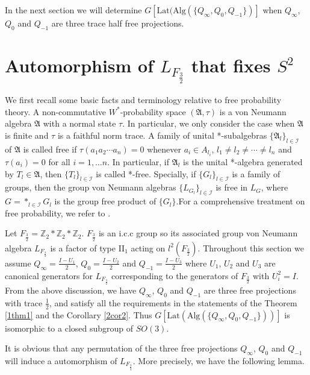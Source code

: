 \documentclass{amsart}
\newcommand{\AAA}{\mathfrak A}
\newcommand{\Lat}{\mathrm{Lat}}
\newcommand{\Alg}{\mathrm{Alg}}
\newcommand{\Z}{\mathbb Z} %
\begin{document}
In the next section we will determine $ G[\Lat(\Alg( \{ Q_{\infty},  Q_{0}, Q_{-1} \})]$ when $Q_{\infty}$, $Q_{0}$ and $Q_{-1} $ are three trace half free projections.


\section{Automorphism of $L_{F_{\frac{3}{2}}}$ that fixes $S^2$}

We first recall some basic facts and terminology relative to free probability theory.
A non-commutative $W^{*}$-probability space $(\AAA, \tau)$ is a von Neumann algebra $\AAA$ with a normal state $\tau$.
In particular, we only consider the case when $\AAA$ is finite and $\tau$ is a faithful norm trace. 
A family of unital *-subalgebras $\{\AAA_{l} \}_{l \in \mathcal{I}}$ of $\AAA$ is called free if $\tau(a_1 a_2 \cdots a_n) = 0$ 
whenever $a_i \in A_{l_{i}}$, $l_1 \neq l_2 \neq \cdots \neq l_n$ and $\tau(a_{i}) = 0$ for all $i = 1, \ldots n$.
In particular, if $\AAA_l$ is the unital *-algebra generated by $T_l \in \AAA$, then $\{T_l \}_{l \in \mathcal{I}}$ is called *-free.  
Specially, if $\{G_l\}_{l \in \mathcal{I}}$ is a family of groups, then  
the group von Neumann algebras $\{L_{G_l} \}_{l \in \mathcal{I}}$ is free in $L_{G}$, where $G = *_{l \in \mathcal{I}} G_{l}$ is the group free 
product of $\{G_l\}$.For a comprehensive treatment on free probability, we refer to \cite{VDN, NS}. 

Let $F_{\frac{3}{2}} = \Z_{2}*\Z_{2}*\Z_{2}$. $F_{\frac{3}{2}} $ is an i.c.c group so its associated group von Neumann algebra $L_{F_{\frac{3}{2}}}$ is 
a factor of type II$_1$ acting on $l^2(F_{\frac{3}{2}})$.
Throughout this section we assume $Q_{\infty} = \frac{I - U_1}{2}$, $Q_{0} = \frac{I - U_2}{2}$ and $Q_{-1} = \frac{I - U_3}{2}$
where $U_1$, $U_2$ and $U_3$ are canonical generators for $L_{F_{\frac{3}{2}}}$ corresponding to the generators of $F_{\frac{3}{2}}$ with $U_{i}^2 = I$.
From the above discussion, we have $Q_{\infty}$, $Q_{0}$ and $Q_{-1} $ are three free projections with trace $\frac{1}{2}$, and 
satisfy all the requirements in the statements of the Theorem \ref{1thm1} and the Corollary \ref{2cor2}. Thus $G[\Lat(\Alg( \{ Q_{\infty},  Q_{0}, Q_{-1} \}))]$ is isomorphic to 
a closed subgroup of $SO(3)$. 

It is obvious that any permutation of the three free projections $Q_{\infty}$, $Q_{0}$ and $Q_{-1} $ will induce a automorphism of $L_{F_{\frac{3}{2}}}$.
More precisely, we have the following lemma.
\end{document}
